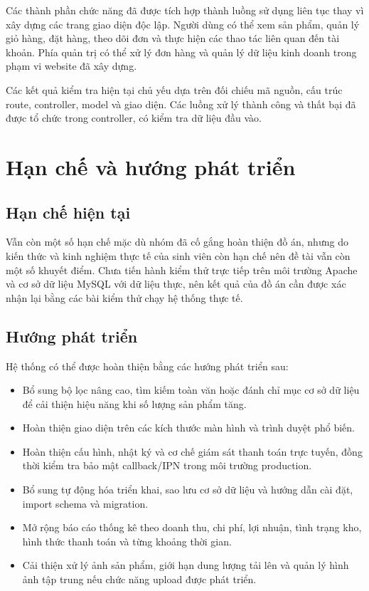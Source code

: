 Các thành phần chức năng đã được tích hợp thành luồng sử dụng liên tục thay vì xây dựng các trang giao diện độc lập. Người dùng có thể xem sản phẩm, quản lý giỏ hàng, đặt hàng, theo dõi đơn và thực hiện các thao tác liên quan đến tài khoản. Phía quản trị có thể xử lý đơn hàng và quản lý dữ liệu kinh doanh trong phạm vi website đã xây dựng.

Các kết quả kiểm tra hiện tại chủ yếu dựa trên đối chiếu mã nguồn, cấu trúc route, controller, model và giao diện. Các luồng xử lý thành công và thất bại đã được tổ chức trong controller, có kiểm tra dữ liệu đầu vào.

\section{Hạn chế và hướng phát triển}

\subsection{Hạn chế hiện tại}
Vẫn còn một số hạn chế mặc dù nhóm đã cố gắng hoàn thiện đồ án, nhưng do kiến thức và kinh nghiệm thực tế của sinh viên còn hạn chế nên đề tài vẫn còn một số khuyết điểm. Chưa tiến hành kiểm thử trực tiếp trên môi trường Apache và cơ sở dữ liệu MySQL với dữ liệu thực, nên kết quả của đồ án cần được xác nhận lại bằng các bài kiểm thử chạy hệ thống thực tế.

\subsection{Hướng phát triển}


Hệ thống có thể được hoàn thiện bằng các hướng phát triển sau:
\begin{itemize}
    \item Bổ sung bộ lọc nâng cao, tìm kiếm toàn văn hoặc đánh chỉ mục cơ sở dữ liệu để cải thiện hiệu năng khi số lượng sản phẩm tăng.
    \item Hoàn thiện giao diện trên các kích thước màn hình và trình duyệt phổ biến.
    \item Hoàn thiện cấu hình, nhật ký và cơ chế giám sát thanh toán trực tuyến, đồng thời kiểm tra bảo mật callback/IPN trong môi trường production.
    \item Bổ sung tự động hóa triển khai, sao lưu cơ sở dữ liệu và hướng dẫn cài đặt, import schema và migration.
    \item Mở rộng báo cáo thống kê theo doanh thu, chi phí, lợi nhuận, tình trạng kho, hình thức thanh toán và từng khoảng thời gian.
    \item Cải thiện xử lý ảnh sản phẩm, giới hạn dung lượng tải lên và quản lý hình ảnh tập trung nếu chức năng upload được phát triển.
\end{itemize}

